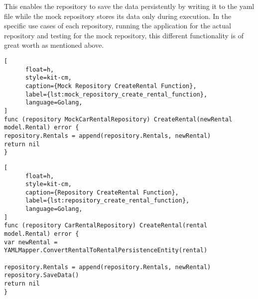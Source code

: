 This enables the repository to save the data persistently by writing it to the yaml file while the mock repository stores its data only during execution.
In the specific use cases of each repository, running the application for the actual repository and testing for the mock repository, this different functionality is of great worth as mentioned above.

\begin{lstlisting}[
      float=h,
      style=kit-cm,
      caption={Mock Repository CreateRental Function},
      label={lst:mock_repository_create_rental_function},
      language=Golang,
]
func (repository MockCarRentalRepository) CreateRental(newRental model.Rental) error {
repository.Rentals = append(repository.Rentals, newRental)
return nil
}
\end{lstlisting}

\begin{lstlisting}[
      float=h,
      style=kit-cm,
      caption={Repository CreateRental Function},
      label={lst:repository_create_rental_function},
      language=Golang,
]
func (repository CarRentalRepository) CreateRental(rental model.Rental) error {
var newRental = YAMLMapper.ConvertRentalToRentalPersistenceEntity(rental)

repository.Rentals = append(repository.Rentals, newRental)
repository.SaveData()
return nil
}
\end{lstlisting}